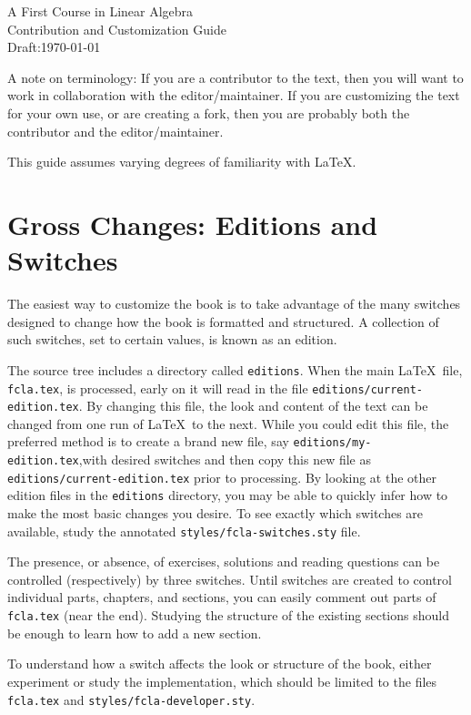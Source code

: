 \documentclass[12pt]{article}
\newcommand{\sourcefile}[1]{{\tt#1}}
\begin{document}
\begin{center}
{\Large
A First Course in Linear Algebra\\
Contribution and Customization Guide}\\[12pt]
Draft:\quad \today
\end{center}
%
A note on terminology:  If you are a contributor to the text, then you will want to work in collaboration with the editor/maintainer.  If you are customizing the text for your own use, or are creating a fork, then you are probably both the contributor and the editor/maintainer.\par
%
This guide assumes varying degrees of familiarity with \LaTeX.
%
\section*{Gross Changes: Editions and Switches}
%
The easiest way to customize the book is to take advantage of the many switches designed to change how the book is formatted and structured.  A collection of such switches, set to certain values, is known as an edition.\par
%
The source tree includes a directory called \sourcefile{editions}.  When the main \LaTeX\ file, \sourcefile{fcla.tex}, is processed, early on it will read in the file \sourcefile{editions/current-edition.tex}.  By changing this file, the look and content of the text can be changed from one run of \LaTeX\ to the next.  While you could edit this file, the preferred method is to create a brand new file, say \sourcefile{editions/my-edition.tex},with desired switches and then copy this new file as \sourcefile{editions/current-edition.tex} prior to processing.  By looking at the other edition files in the \sourcefile{editions} directory, you may be able to quickly infer how to make the most basic changes you desire.  To see exactly which switches are available, study the annotated \sourcefile{styles/fcla-switches.sty} file.\par
%
The presence, or absence, of exercises, solutions and reading questions can be controlled (respectively) by three switches.  Until switches are created to control individual parts, chapters, and sections, you can easily comment out parts of \sourcefile{fcla.tex} (near the end).  Studying the structure of the existing sections should be enough to learn how to add a new section.\par
%
To understand how a switch affects the look or structure of the book, either experiment or study the implementation, which should be limited to the files \sourcefile{fcla.tex} and \sourcefile{styles/fcla-developer.sty}.
%
\end{document}

